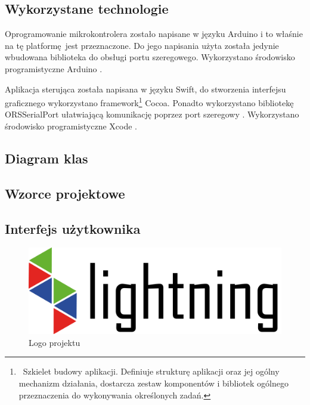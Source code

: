 \documentclass[12pt]{report}
\begin{document}
\subsection{Wykorzystane technologie}

Oprogramowanie mikrokontrolera zostało napisane w języku Arduino i to właśnie na tę platformę jest przeznaczone. Do jego napisania użyta została jedynie wbudowana biblioteka do obsługi portu szeregowego. Wykorzystano środowisko programistyczne Arduino \cite{arduinoide}.

Aplikacja sterująca została napisana w języku Swift, do stworzenia interfejsu graficznego wykorzystano framework\footnote{~Szkielet budowy aplikacji. Definiuje strukturę aplikacji oraz jej ogólny mechanizm działania, dostarcza zestaw komponentów i bibliotek ogólnego przeznaczenia do wykonywania określonych zadań.} Cocoa. Ponadto wykorzystano bibliotekę\\ORSSerialPort ułatwiającą komunikację poprzez port szeregowy \cite{orsserialport}. Wykorzystano środowisko programistyczne Xcode \cite{xcode}.

\subsection{Diagram klas}


\subsection{Wzorce projektowe}


\subsection{Interfejs użytkownika}

\begin{figure}[h]
\centering
\includegraphics[width=\textwidth]{../resources/logo.png}
\caption{Logo projektu}
\end{figure}
\end{document}
